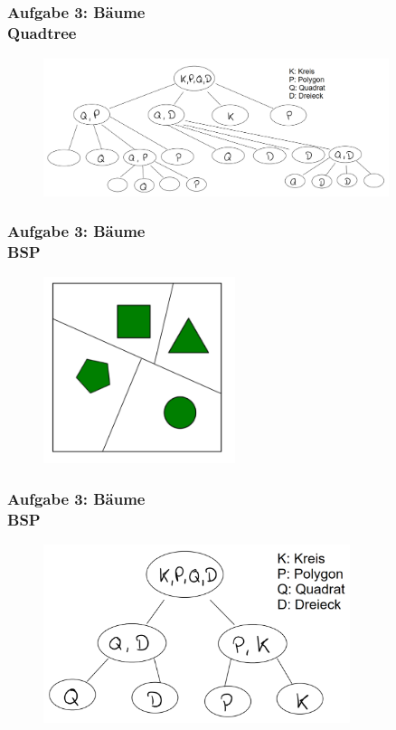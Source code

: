 \documentclass[accentcolor=tud9c,colorbacktitle,inverttitle,landscape,german,presentation,t]{tudbeamer}
\begin{document}
\begin{frame}
	\frametitle{Aufgabe 3: B\"aume \\Quadtree}
	\begin{figure}
		\centering
		\includegraphics[width=0.9\textwidth]{Quadtree-Nodes}
	\end{figure}
\end{frame}

\begin{frame}
	\frametitle{Aufgabe 3: B\"aume \\BSP} 
	\begin{figure}
		\centering
		\includegraphics[width=0.5\textwidth]{BSP}
	\end{figure}
\end{frame}

\begin{frame}
	\frametitle{Aufgabe 3: B\"aume \\BSP} 
	\begin{figure}
		\centering
		\includegraphics[width=0.8\textwidth]{BSP-Nodes}
	\end{figure}
\end{frame}
\end{document}
